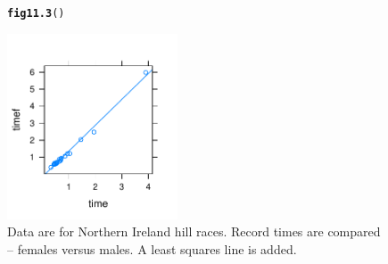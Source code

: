 \documentclass[12pt, a4paper,  BCOR=8.25mm, DIV=15]{scrartcl}\usepackage[]{graphicx}\usepackage[]{color}
\makeatletter
\newcommand{\hlstd}[1]{\textcolor[rgb]{0.345,0.345,0.345}{#1}}%
\newcommand{\hlkwd}[1]{\textcolor[rgb]{0.737,0.353,0.396}{\textbf{#1}}}%
\newenvironment{kframe}{%
 \def\at@end@of@kframe{}%
 \ifinner\ifhmode%
  \def\at@end@of@kframe{\end{minipage}}%
  \begin{minipage}{\columnwidth}%
 \fi\fi%
 \def\FrameCommand##1{\hskip\@totalleftmargin \hskip-\fboxsep
 \colorbox{shadecolor}{##1}\hskip-\fboxsep
     \hskip-\linewidth \hskip-\@totalleftmargin \hskip\columnwidth}%
 \MakeFramed {\advance\hsize-\width
   \@totalleftmargin\z@ \linewidth\hsize
   \@setminipage}}%
 {\par\unskip\endMakeFramed%
 \at@end@of@kframe}
\newenvironment{knitrout}{}{} %
\makeatother
\begin{document}
\begin{figure}[H]
\begin{knitrout}
\color{fgcolor}\begin{kframe}
\begin{alltt}
\hlkwd{fig11.3}\hlstd{()}
\end{alltt}
\end{kframe}

{\centering \includegraphics[width=0.45\textwidth]{figs/reg-fVSmTime-11_3-1} 

}



\end{knitrout}
  \caption{Data are for Northern Ireland hill races.
    Record times are compared -- females versus males.  A least squares line
    is added.}\label{fig:nimff}
\end{figure}
\end{document}
